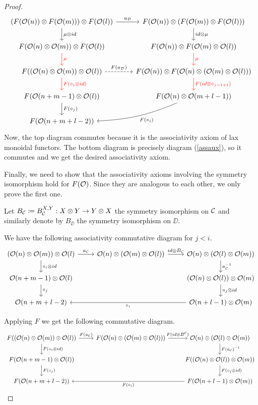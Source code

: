 \documentclass[Thesis.tex]{subfiles}
\begin{document}
\begin{proof}
      \[   
\begin{tikzcd}
(F(\OO(n))\otimes F(\OO(m)))\otimes F(\OO(l)) \arrow[r, "a_\DD"] \arrow[d, "\mu\otimes id"] & F(\OO(n))\otimes (F(\OO(m))\otimes F(\OO(l)))\arrow[d, "id\otimes \mu"]\\
F(\OO(n)\otimes \OO(m))\otimes F(\OO(l))\arrow[d, red, "\mu"] & F(\OO(n))\otimes F(\OO(m)\otimes\OO(l))\arrow[d, red, "\mu"]\\
F((\OO(n)\otimes\OO(m))\otimes\OO(l))\arrow[d, red, "F(\circ_i\otimes id)"]\arrow[r, dashed, "F(a_\DD)"] & F(\OO(n))\otimes F(\OO(n)\otimes(\OO(m)\otimes\OO(l)))\arrow[d, red, "F(id\otimes \circ_{j-1+1})"]\\
F(\OO(n+m-1)\otimes\OO(l))\arrow[d, "F(\circ_j)"] & F(\OO(n)\otimes\OO(m+l-1))\arrow[dl, bend left = 10, "F(\circ_i)"]\\
F(\OO(n+m+l-2)) & 
\end{tikzcd}   
   \]
   Now, the top diagram commutes because it is the associativity axiom of lax monoidal functors. The bottom diagram is precisely diagram (\ref{assaux}), so it commutes and we get the desired associativity axiom.
   
   Finally, we need to show that the associativity axioms involving the symmetry isomorphism hold for $F({\mathcal O})$. Since they are analogous to each other, we only prove the first one.
   
   Let $B_{\mathcal C}\coloneqq B_{\mathcal C}^{X,Y}:X\otimes Y\to Y\otimes X$ the symmetry isomorphism on ${\mathcal C}$ and similarly denote by $B_\DD$ the symmetry isomorphism on $\DD$.
   
   We have the following associativity commutative diagram for $j<i$.
   \[
   \begin{tikzcd}
   (\OO(n)\otimes \OO(m))\otimes\OO(l)\arrow[r, "a_\CC"]\arrow[d, "\circ_i\otimes id"] & \OO(n)\otimes (\OO(m)\otimes \OO(l)) \arrow[r, "id\otimes B_\CC"] & \OO(n)\otimes (\OO(l)\otimes \OO(m))\arrow[d, "a^{-1}_\CC"]\\
   \OO(n+m-1)\otimes\OO(l)\arrow[d, "\circ_j"] & & (\OO(n)\otimes\OO(l))\otimes \OO(m)\arrow[d, "\circ_j\otimes id"]\\
   \OO(n+m+l-2) & & \OO(n+l-1)\otimes \OO(m)\arrow[ll, "\circ_i"]
   \end{tikzcd}
   \]
   
   Applying $F$ we get the following commutative diagram.
   \begin{equation}\label{assiaux}
      \begin{tikzcd}
   F((\OO(n)\otimes \OO(m))\otimes\OO(l))\arrow[r, "F(a_\CC)"]\arrow[d, "F(\circ_i\otimes id)"] & F(\OO(n)\otimes (\OO(m)\otimes \OO(l))) \arrow[r, "F(id\otimes B^\CC)"] & \OO(n)\otimes (\OO(l)\otimes \OO(m))\arrow[d, "F(a_\CC)^{-1}"]\\
  F(\OO(n+m-1)\otimes\OO(l))\arrow[d, "F(\circ_j)"] & & F((\OO(n)\otimes\OO(l))\otimes \OO(m))\arrow[d, "F(\circ_j\otimes id)"]\\
   F(\OO(n+m+l-2)) & &F(\OO(n+l-1)\otimes \OO(m))\arrow[ll, "F(\circ_i)"]
   \end{tikzcd}
   \end{equation}
   

\end{proof}
\end{document}
